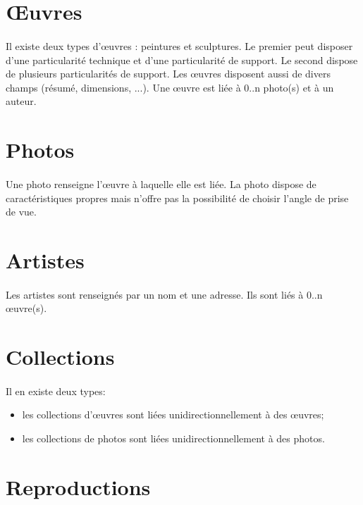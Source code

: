 \section{Œuvres}
\paragraph{}
Il existe deux types d'\oe{}uvres : peintures et sculptures. Le premier peut disposer d'une particularité technique et d'une particularité de support. Le second dispose de plusieurs particularités de support.
Les \oe{}uvres disposent aussi de divers champs (résumé, dimensions, ...). Une \oe{}uvre est liée à 0..n photo(s) et à un auteur.

\section{Photos}
\paragraph{}
Une photo renseigne l'\oe{}uvre à laquelle elle est liée. La photo dispose de caractéristiques propres mais n'offre pas la possibilité de choisir l'angle de prise de vue.

\section{Artistes}
\paragraph{}
Les artistes sont renseignés par un nom et une adresse. Ils sont liés à 0..n \oe{}uvre(s). 

\section{Collections}
\paragraph{}
Il en existe deux types:
\begin{itemize}
\item les collections d'\oe{}uvres sont liées unidirectionnellement à des \oe{}uvres;
\item les collections de photos sont liées unidirectionnellement à des photos.
\end{itemize}

\section{Reproductions}

